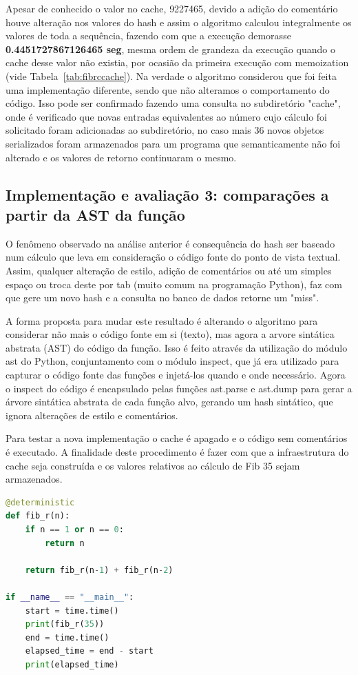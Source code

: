 \documentclass[sigconf]{acmart}
\begin{document}
Apesar de conhecido o valor no cache, 9227465, devido a adição do comentário houve alteração nos valores do hash e assim o algoritmo calculou integralmente os valores de toda a sequência, fazendo com que a execução demorasse \textbf{0.4451727867126465 seg}, mesma ordem de grandeza da execução quando o cache desse valor não existia, por ocasião da primeira execução com memoization (vide Tabela~\ref{tab:fibrccache}). Na verdade o algoritmo considerou que foi feita uma implementação diferente, sendo que não alteramos o comportamento do código. Isso pode ser confirmado fazendo uma consulta no subdiretório "cache", onde é verificado que novas entradas equivalentes ao número cujo cálculo foi solicitado foram adicionadas ao subdiretório, no caso mais 36 novos objetos serializados foram armazenados para um programa que semanticamente não foi alterado e os valores de retorno continuaram o mesmo.

\subsection{Implementação e avaliação 3: comparações a partir da AST da função}
O fenômeno observado na análise anterior é consequência do hash ser baseado num cálculo que leva em consideração o código fonte do ponto de vista textual. Assim, qualquer alteração de estilo, adição de comentários ou até um simples espaço ou troca deste por tab (muito comum na programação Python), faz com que gere um novo hash e a consulta no banco de dados retorne um "miss". 

A forma proposta para mudar este resultado é alterando o algoritmo para considerar não mais o código fonte em si (texto), mas agora a arvore sintática abstrata \cite{aho1986compilers}(AST) do código da função. Isso é feito através da utilização do módulo ast do Python, conjuntamento com o módulo inspect, que já era utilizado para capturar o código fonte das funções e injetá-los quando e onde necessário. Agora o inspect do código é encapsulado pelas funções ast.parse e ast.dump para gerar a árvore sintática abstrata de cada função alvo, gerando um hash sintático, que ignora alterações de estilo e comentários.

Para testar a nova implementação o cache é apagado e o código sem comentários é executado. A finalidade deste procedimento é fazer com que a infraestrutura do cache seja construída e os valores relativos ao cálculo de Fib 35 sejam armazenados.

\renewcommand{\lstlistingname}{Trecho de código}
\begin{lstlisting}[language=Python, caption=Sequência de Fibonacci recursiva com memoization e processamento do AST no backend]
@deterministic
def fib_r(n):
    if n == 1 or n == 0:
        return n

    return fib_r(n-1) + fib_r(n-2)

if __name__ == "__main__":
    start = time.time()
    print(fib_r(35))
    end = time.time()
    elapsed_time = end - start
    print(elapsed_time)
\end{lstlisting}
\end{document}
